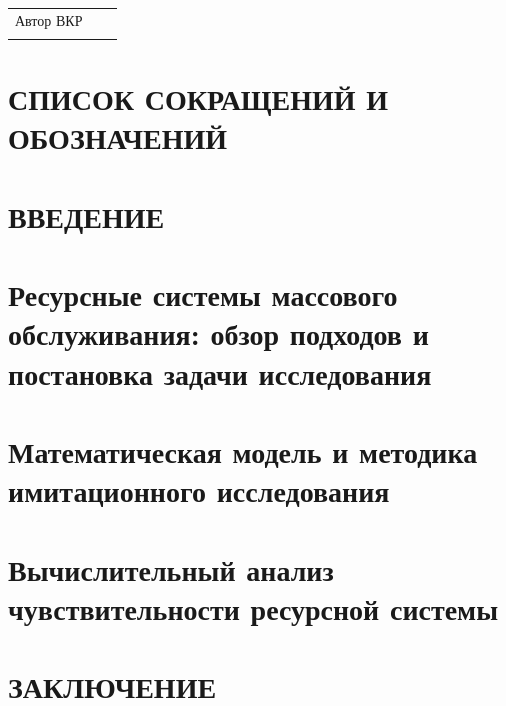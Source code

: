 \documentclass[a4paper,14pt]{extreport}
\begin{document}
\vspace{1.8em}



\vfill

\noindent
\begin{tabular}{@{}p{}p{}p{}@{}}
Автор ВКР &
\centering\underline{\hspace{2.8cm}} &
\centering\underline{\hspace{4.2cm}}\arraybackslash \\
&
\centering{\small (Подпись)} &
\centering{\small (ФИО)}\arraybackslash
\end{tabular}

\endgroup
\clearpage


\tableofcontents
\clearpage

\chapter*{СПИСОК СОКРАЩЕНИЙ И ОБОЗНАЧЕНИЙ}

\clearpage

\chapter*{ВВЕДЕНИЕ}

\clearpage

\chapter{Ресурсные системы массового обслуживания: обзор подходов и постановка задачи исследования}

\clearpage

\chapter{Математическая модель и методика имитационного исследования}

\clearpage

\chapter{Вычислительный анализ чувствительности ресурсной системы}

\clearpage

\chapter*{ЗАКЛЮЧЕНИЕ}

\clearpage

\printbibliography[heading=bibintoc, title={СПИСОК ИСПОЛЬЗОВАННЫХ ИСТОЧНИКОВ}]
\clearpage

\appendix


\end{document}
